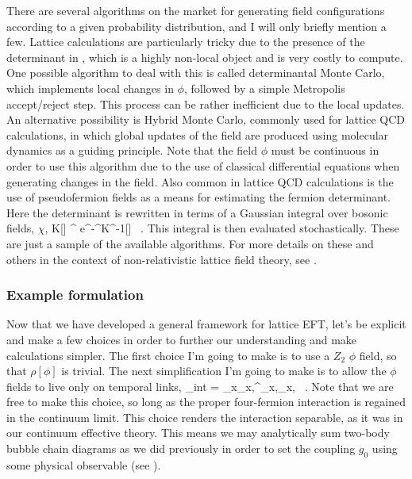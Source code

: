 There are several algorithms on the market for generating field configurations according to a given probability distribution, and I will only briefly mention a few. Lattice calculations are particularly tricky due to the presence of the determinant in , which is a highly non-local object and is very costly to compute. One possible algorithm to deal with this is called determinantal Monte  Carlo, which implements local changes in $\phi$, followed by a simple Metropolis accept/reject step. This process can be rather inefficient due to the local updates. An alternative possibility is Hybrid Monte Carlo, commonly used for lattice QCD calculations, in which global updates of the field are produced using molecular dynamics as a guiding principle. Note that the field $\phi$ must be continuous in order to use this algorithm due to the use of classical differential equations when generating changes in the field. Also common in lattice QCD calculations is the use of pseudofermion fields as a means for estimating the fermion determinant. Here the determinant is rewritten in terms of a Gaussian integral over bosonic fields, $\chi$,
\beq
\det K[\phi] \propto {} \chi^{\dagger}{} \chi e^{-\chi^{\dagger}K^{-1}[\phi]\chi} \ .
\eeq
This integral is then evaluated stochastically. These are just a sample of the available algorithms. For more details on these and others in the context of non-relativistic lattice field theory, see \cite{Drut:2012md}.

\subsubsection{Example formulation}
Now that we have developed a general framework for lattice EFT, let's be explicit and make a few choices in order to further our understanding and make calculations simpler. The first choice I'm going to make is to use a $Z_2$ $\phi$ field, so that $\rho[\phi]$ is trivial. The next simplification I'm going to make is to allow the $\phi$ fields to live only on temporal links,
\beq
\label{eq:pointint}
{}_{\mbox{\tiny int}} = \sum_{{\mathbf x}}\phi_{{\mathbf x},\tau}\psi^{\dagger}_{{\mathbf x},\tau}\psi_{{\mathbf x},} \ .
\eeq
Note that we are free to make this choice, so long as the proper four-fermion interaction is regained in the continuum limit. This choice renders the interaction separable, as it was in our continuum effective theory. This means we may analytically sum two-body bubble chain diagrams as we did previously in order to set the coupling $g_0$ using some physical observable (see ). 

